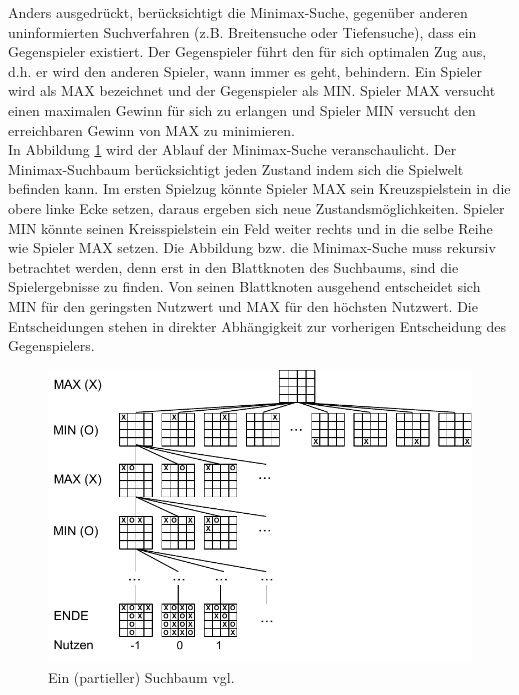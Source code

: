 Anders ausgedrückt, berücksichtigt die Minimax-Suche, gegenüber anderen uninformierten Suchverfahren (z.B. Breitensuche oder Tiefensuche), dass ein Gegenspieler existiert. Der Gegenspieler führt den für sich optimalen Zug aus, d.h. er wird den anderen Spieler, wann immer es geht, behindern. Ein Spieler wird als MAX bezeichnet und der Gegenspieler als MIN. Spieler MAX versucht einen maximalen Gewinn für sich zu erlangen und Spieler MIN versucht den erreichbaren Gewinn von MAX zu minimieren.\\

In Abbildung \ref{fig:minimax_tictactoe} wird der Ablauf der Minimax-Suche veranschaulicht. Der Minimax-Suchbaum berücksichtigt jeden Zustand indem sich die Spielwelt befinden kann. Im ersten Spielzug könnte Spieler MAX sein Kreuzspielstein in die obere linke Ecke setzen, daraus ergeben sich neue Zustandsmöglichkeiten. Spieler MIN könnte seinen Kreisspielstein ein Feld weiter rechts und in die selbe Reihe wie Spieler MAX setzen. Die Abbildung bzw. die Minimax-Suche muss rekursiv betrachtet werden, denn erst in den Blattknoten des Suchbaums, sind die Spielergebnisse zu finden. Von seinen Blattknoten ausgehend entscheidet sich MIN für den geringsten Nutzwert und MAX für den höchsten Nutzwert. Die Entscheidungen stehen in direkter Abhängigkeit zur vorherigen Entscheidung des Gegenspielers. \\
  
\begin{figure}[!htbp]
  \centering
  \includegraphics{inhalt/abbildungen/minimax_tictactoe.pdf}
  \caption{Ein (partieller) Suchbaum vgl. \cite[208]{Russell}}
  \label{fig:minimax_tictactoe}
\end{figure} 

